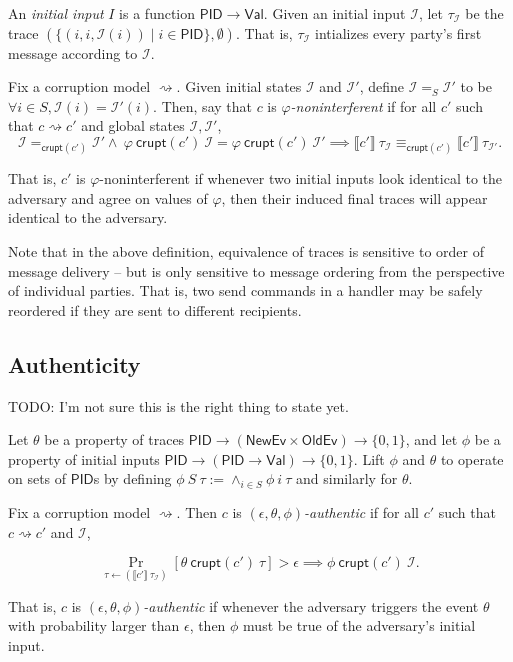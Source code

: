 \documentclass{article}
\newcommand{\Val}{\mathsf{Val}}
\newcommand{\PID}{\mathsf{PID}}
\newcommand{\NewEv}{\mathsf{NewEv}}
\newcommand{\OldEv}{\mathsf{OldEv}}
\newcommand{\I}{\mathcal{I}}
\begin{document}
An \emph{initial input} $I$ is a function $\PID \to \Val$. Given an initial input $\I$, let $\tau_\I$ be the trace $(\{(i,i,\I(i)) \mid i \in \textsf{PID}\}, \emptyset)$. That is, $\tau_\I$ intializes every party's first message according to $\I$.

Fix a corruption model $\rightsquigarrow$. Given initial states $\I$ and $\I'$, define $\I =_S \I'$ to be $\forall i \in S, \I(i) = \I'(i).$ Then, say that $c$ is \emph{$\varphi$-noninterferent} if for all $c'$ such that $c \rightsquigarrow c'$ and global states $\I, \I'$, 
\[ \I=_{\mathsf{crupt}(c')}\I' \wedge\ \varphi\ \mathsf{crupt}(c')\ \I = \varphi\ \mathsf{crupt}(c')\ \I' \implies \llbracket c' \rrbracket\ \tau_\I \equiv_{\mathsf{crupt}(c')} \llbracket c' \rrbracket\ \tau_{\I'}.\]

That is, $c'$ is $\varphi$-noninterferent  if whenever two initial inputs look identical to the adversary and agree on values of $\varphi$, then their induced final traces will appear identical to the adversary. 

Note that in the above definition, equivalence of traces is sensitive to order of message delivery -- but is only sensitive to message ordering from the perspective of individual parties. That is, two send commands in a handler may be safely reordered if they are sent to different recipients.


\subsection{Authenticity}

TODO: I'm not sure this is the right thing to state yet.

Let $\theta$ be a property of traces $\PID \to (\NewEv \times \OldEv) \to \{0,1\}$, and let $\phi$ be a property of initial inputs $\PID \to (\PID \to \Val) \to \{0,1\}$. Lift $\phi$ and $\theta$ to operate on sets of $\PID$s by defining $\phi\ S\ \tau := \wedge_{i \in S} \phi\ i\ \tau$ and similarly for $\theta$.

Fix a corruption model $\rightsquigarrow$. Then $c$ is \emph{$(\epsilon, \theta, \phi)$-authentic} if for all $c'$ such that $c \rightsquigarrow c'$ and $\I$,

\[ \Pr_{\tau \leftarrow (\llbracket c' \rrbracket\ \tau_\I)}[\theta\ \mathsf{crupt}(c')\ \tau] > \epsilon \implies \phi\ \mathsf{crupt}(c')\ \I.\]

That is, $c$ is \emph{$(\epsilon, \theta, \phi)$-authentic} if whenever the adversary triggers the event $\theta$ with probability larger than $\epsilon$, then $\phi$ must be true of the adversary's initial input.
\end{document}
